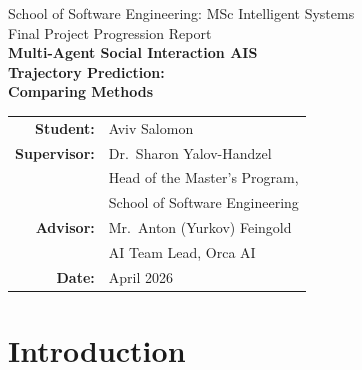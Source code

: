 \documentclass[12pt, a4paper]{article}
\newcommand{\TODO}[1]{\textcolor{red}{\textbf{[TODO: #1]}}}
\begin{document}
  \begin{titlepage}
      \centering
      \vspace*{1cm}

      {\large School of Software Engineering: MSc Intelligent Systems}\\[0.5cm]
      {\large Final Project Progression Report}\\[1.5cm]

      {\Huge\bfseries Multi-Agent Social Interaction AIS\\[0.3cm]
      Trajectory Prediction:\\[0.3cm]
      Comparing Methods}\\[2cm]

      \begin{tabular}{rl}
          \textbf{Student:}    & Aviv Salomon \\[0.3cm]
          \textbf{Supervisor:} & Dr.\ Sharon Yalov-Handzel \\
                               & Head of the Master's Program, \\
                               & School of Software Engineering \\[0.3cm]
          \textbf{Advisor:}    & Mr.\ Anton (Yurkov) Feingold \\
                               & AI Team Lead, Orca AI \\[0.3cm]
          \textbf{Date:}       & April 2026 \\
      \end{tabular}

      \vfill
  \end{titlepage}

  \begin{abstract}
  \TODO{Write last, after all results are in. Structure:
  (1) problem sentence,
  (2) the gap — no fair comparison exists in maritime trajectory prediction,
  (3) what you built — unified benchmark + pipeline + three methods,
  (4) key result — minADE6=X, minFDE6=Y for best model,
  (5) significance — reproducible toolkit released.
  Target: 200--250 words.}
  \end{abstract}

  \newpage
  \tableofcontents
  \newpage

  \section{Introduction}
  \label{sec:intro}
\end{document}
